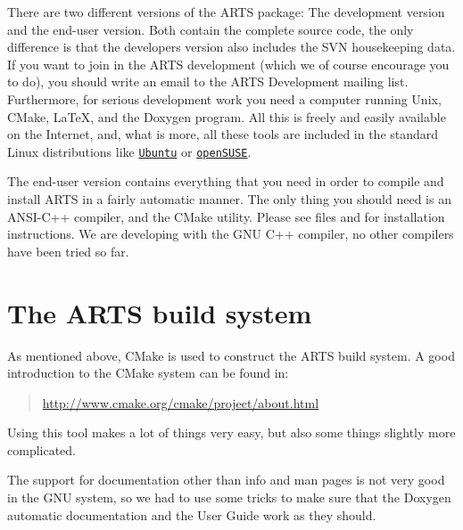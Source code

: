 There are two different versions of the ARTS package: The development
version and the end-user version. Both contain the complete source
code, the only difference is that the developers version also includes
the SVN housekeeping data. If you want to join in the ARTS development
(which we of course encourage you to do), you should write an email to
the ARTS Development mailing list.
Furthermore, for serious development work you need a computer running
Unix, CMake, LaTeX, and the Doxygen program.  All
this is freely and easily available on the Internet, and, what is
more, all these tools are included in the standard Linux
distributions like \href{http://www.ubuntu.com/}{\nolinkurl{Ubuntu}} or \href{http://www.opensuse.org/}{\nolinkurl{openSUSE}}.

The end-user version contains everything that you need in order to
compile and install ARTS in a fairly automatic manner. The only thing
you should need is an ANSI-C++ compiler, and the CMake utility. Please
see files  and  for
installation instructions. We are developing with the GNU C++ compiler,
no other compilers have been tried so far.

\section{The ARTS build system}

As mentioned above, CMake is used to construct the ARTS
build system. A good introduction to the CMake system can be found in:
\begin{quote}
  \url{http://www.cmake.org/cmake/project/about.html}
\end{quote}
Using this tool makes a lot of things very easy, but also some
things slightly more complicated.


The support for documentation other than info and man pages is not
very good in the GNU system, so we had to use some tricks to make sure
that the Doxygen automatic documentation and the User Guide work as they
should. 

